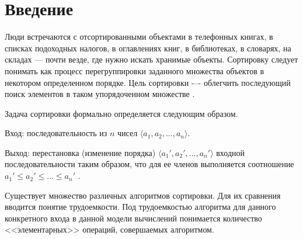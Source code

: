 {\center\chapter*{Введение}}

Люди встречаются с отсортированными объектами в телефонных книгах, в списках подоходных налогов, в оглавлениях книг, в библиотеках, в словарях, на складах –-- почти везде, где нужно искать хранимые объекты. 
Сортировку следует понимать как процесс перегруппировки заданного множества объектов в некотором определенном порядке. 
Цель сортировки -–- облегчить последующий поиск элементов в таком упорядоченном множестве \cite{Wirth1989}.

Задача сортировки формально определяется следующим образом.

Вход: последовательность из $n$ чисел $\langle a_1, a_2,...,a_n \rangle$.

Выход: перестановка (изменение порядка) $\langle a_1', a_2',...,a_n' \rangle$ входной последовательности таким образом, что для ее членов выполняется соотношение $a_1' \leq a_2'\leq ... \leq a_n'$ \cite{Cormen2011}.

Существует множество различных алгоритмов сортировки. 
Для их сравнения вводится понятие трудоемкости. 
Под трудоемкостью алгоритма для данного конкретного входа в данной модели вычислений понимается количество <<элементарных>> операций, совершаемых алгоритмом.
